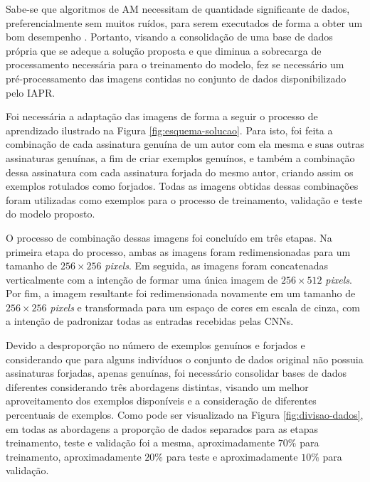 Sabe-se que algoritmos de AM necessitam de quantidade significante de dados, preferencialmente sem muitos ruídos, para serem executados de forma a obter um bom desempenho \cite{marsland}. Portanto, visando a consolidação de uma base de dados própria que se adeque a solução proposta e que diminua a sobrecarga de processamento necessária para o treinamento do modelo, fez se necessário um pré-processamento das imagens contidas no conjunto de dados disponibilizado pelo IAPR.

Foi necessária a adaptação das imagens de forma a seguir o processo de aprendizado ilustrado na Figura \ref{fig:esquema-solucao}. Para isto, foi feita a combinação de cada assinatura genuína de um autor com ela mesma e suas outras assinaturas genuínas, a fim de criar exemplos genuínos, e também a combinação dessa assinatura com cada assinatura forjada do mesmo autor, criando assim os exemplos rotulados como forjados. Todas as imagens obtidas dessas combinações foram utilizadas como exemplos para o processo de treinamento, validação e teste do modelo proposto.

O processo de combinação dessas imagens foi concluído em três etapas. Na primeira etapa do processo, ambas as imagens foram redimensionadas para um tamanho de $256 \times 256$ \emph{pixels}. Em seguida, as imagens foram concatenadas verticalmente com a intenção de formar uma única imagem de $256 \times 512$ \emph{pixels}. Por fim, a imagem resultante foi redimensionada novamente em um tamanho de $256 \times 256$ \emph{pixels} e transformada para um espaço de cores em escala de cinza, com a intenção de padronizar todas as entradas recebidas pelas CNNs.


Devido a desproporção no número de exemplos genuínos e forjados e considerando que para alguns indivíduos o conjunto de dados original não possuia assinaturas forjadas, apenas genuínas, foi necessário consolidar bases de dados diferentes considerando três abordagens distintas, visando um melhor aproveitamento dos exemplos disponíveis e a consideração de diferentes percentuais de exemplos. Como pode ser visualizado na Figura \ref{fig:divisao-dados}, em todas as abordagens a proporção de dados separados para as etapas treinamento, teste e validação foi a mesma, aproximadamente $70\%$ para treinamento, aproximadamente $20\%$ para teste e aproximadamente $10\%$ para validação.


